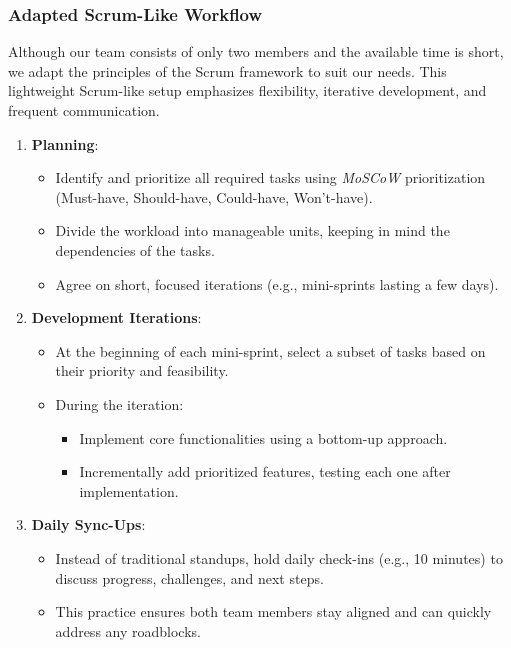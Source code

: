     \subsubsection{Adapted Scrum-Like Workflow}
    Although our team consists of only two members and the available time is short, we adapt the principles of the Scrum framework to suit our needs. This lightweight Scrum-like setup emphasizes flexibility, iterative development, and frequent communication.
    \begin{enumerate}
        \item \textbf{Planning}:
        \begin{itemize}
            \item Identify and prioritize all required tasks using \textit{MoSCoW} prioritization (Must-have, Should-have, Could-have, Won't-have).
            \item  Divide the workload into manageable units, keeping in mind the dependencies of the tasks.
            \item Agree on short, focused iterations (e.g., mini-sprints lasting a few days).
        \end{itemize}
        
        \item \textbf{Development Iterations}:
        \begin{itemize}
            \item At the beginning of each mini-sprint, select a subset of tasks based on their priority and feasibility.
            \item During the iteration:
            \begin{itemize}
                \item Implement core functionalities using a bottom-up approach.
                \item Incrementally add prioritized features, testing each one after implementation.
            \end{itemize}
        \end{itemize}

        \item \textbf{Daily Sync-Ups}:
        \begin{itemize}
            \item Instead of traditional standups, hold daily check-ins (e.g., 10 minutes) to discuss progress, challenges, and next steps.
            \item This practice ensures both team members stay aligned and can quickly address any roadblocks.
        \end{itemize}


\end{enumerate}
